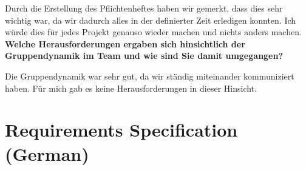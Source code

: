 Durch die Erstellung des Pflichtenheftes haben wir gemerkt, dass dies sehr wichtig war, da wir dadurch alles in der definierter Zeit erledigen konnten. Ich würde dies für jedes Projekt genauso wieder machen und nichts anders machen.
\\

\textbf{Welche Herausforderungen ergaben sich hinsichtlich der Gruppendynamik im Team
und wie sind Sie damit umgegangen?}

Die Gruppendynamik war sehr gut, da wir ständig miteinander kommuniziert haben. Für mich gab es keine Herausforderungen in dieser Hinsicht.

\newpage
\chapter{Requirements Specification (German)} 
\label{Anhang_Pflichtenheft}








